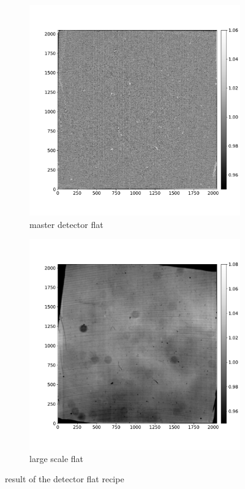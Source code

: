 \documentclass[twoside,single]{lion-msc}
\begin{document}
\begin{figure}[hb]
\centering
\begin{subfigure}{.5\textwidth}
  \centering
  \includegraphics[width=1\linewidth]{masterdetectorflat}
  \caption{master detector flat}
  \label{fig:masterdetectorflat}
\end{subfigure}%
\begin{subfigure}{.5\textwidth}
  \centering
  \includegraphics[width=1\linewidth]{largescaleflat}
  \caption{large scale flat}
  \label{fig:largescaleflat}
\end{subfigure}
\caption{result of the detector flat recipe}
\end{figure}
\end{document}
